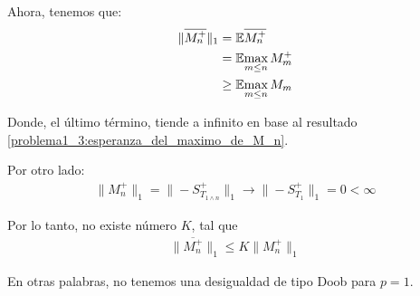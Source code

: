 	Ahora, tenemos que:
	\begin{align}
		\|\overline{M_{n}^{+}}\|_1  &=    \mathbb{E}{\overline{M_{n}^{+}}} \\
									&=    \mathbb{E}{\max_{m \leq n}M_m^+} \\
									&\geq \mathbb{E}{\max_{m \leq n}M_m}										
	\end{align}
		
	Donde, el último término, tiende a infinito en base al resultado 
	\eqref{problema1_3:esperanza_del_maximo_de_M_n}.

	Por otro lado:
	\begin{align}
		\|M_n^+\|_1=\|-S_{T_{1\wedge n}}^{+}\|_1  \longrightarrow  \|-S_{T_1}^+\|_1 = 0 < \infty
	\end{align}
	
	Por lo tanto, no existe número $K$, tal que
	\begin{align}
		 \|\overline{M_n^+}\|_1 \leq  K \|M_n^+\|_1
	\end{align}
	
	En otras palabras, no tenemos una desigualdad de tipo Doob para $p=1$.\\
	